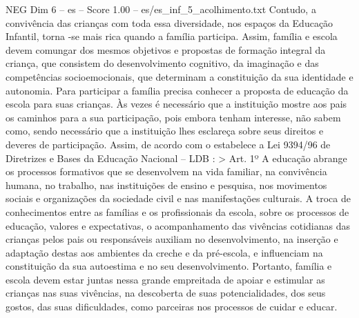 \begin{textsample}{NEG Dim 6 – es – Score 1.00 – es/es\_inf\_5\_acolhimento.txt}
Contudo, a convivência das crianças com toda essa diversidade, nos espaços da Educação Infantil, torna -se mais rica quando a família participa.
Assim, família e escola devem comungar dos mesmos objetivos e propostas de formação integral da criança, que consistem do desenvolvimento cognitivo, da imaginação e das competências socioemocionais, que determinam a constituição da sua identidade e autonomia.
Para participar a família precisa conhecer a proposta de educação da escola para suas crianças.
Às vezes é necessário que a instituição mostre aos pais os caminhos para a sua participação, pois embora tenham interesse, não sabem como, sendo necessário que a instituição lhes esclareça sobre seus direitos e deveres de participação.
Assim, de acordo com o estabelece a Lei 9394/96 de Diretrizes e Bases da Educação Nacional – LDB : > Art. 1º A educação abrange os processos formativos que se desenvolvem na vida familiar, na convivência humana, no trabalho, nas instituições de ensino e pesquisa, nos movimentos sociais e organizações da sociedade civil e nas manifestações culturais.
A troca de conhecimentos entre as famílias e os profissionais da escola, sobre os processos de educação, valores e expectativas, o acompanhamento das vivências cotidianas das crianças pelos pais ou responsáveis auxiliam no desenvolvimento, na inserção e adaptação destas aos ambientes da creche e da pré-escola, e influenciam na constituição da sua autoestima e no seu desenvolvimento.
Portanto, família e escola devem estar juntas nessa grande empreitada de apoiar e estimular as crianças nas suas vivências, na descoberta de suas potencialidades, dos seus gostos, das suas dificuldades, como parceiras nos processos de cuidar e educar.

\end{textsample}
